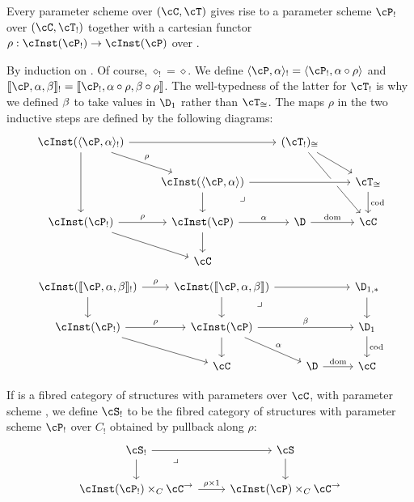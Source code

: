 \documentclass{amsart}
\let\S\cS
\let\P\cP
\def\emptyps{\diamond}
\def\typeps#1#2{\langle #1,#2\rangle}
\def\termps#1#2#3{\llbracket #1,#2,#3\rrbracket}
\let\C\cC
\let\T\cT
\def\pullback#1{\ar[#1,phantom,near start,"\lrcorner"]}
\begin{document}
\begin{prob}
  Every parameter scheme \P over $(\C,\T)$ gives rise to a parameter scheme $\P_!$ over $(\C,\T_!)$ together with a cartesian functor $\rho:\cInst(\P_!)\to\cInst(\P)$ over \C.
\end{prob}
\begin{constr}
  By induction on \P.
  Of course, $\emptyps_!=\emptyps$.
  We define $\typeps{\P}{\al}_! = \typeps{\P_!}{\al\circ \rho}$ and $\termps{\P}{\al}{\be}_! = \termps{\P_!}{\al\circ \rho}{\be\circ \rho}$.
  The well-typedness of the latter for $\T_!$ is why we defined $\beta$ to take values in $\D_1$ rather than $\T_{\cong}$.
  The maps $\rho$ in the two inductive steps are defined by the following diagrams:
    \[
    \begin{tikzcd}
      \cInst(\typeps{\P}{\al}_!) \ar[dr,"\rho"] \ar[rr] \ar[dd] && (\T_!)_{\cong} \ar[dr] \ar[ddr] \\
      & \cInst(\typeps{\P}{\al}) \ar[rr,crossing over] \ar[d] \pullback{dr} && \T_{\cong} \ar[d,"\mathrm{cod}"] \\
      \cInst(\P_!) \ar[r,"\rho"] \ar[dr] & \cInst(\P) \ar[r,"\al"] \ar[d] & \D \ar[r,"\mathrm{dom}"] & \C\\
      & \C
    \end{tikzcd}
    \]
    \[
    \begin{tikzcd}
      \cInst(\termps{\P}{\al}{\be}_!) \ar[r,"\rho"] \ar[d] & \cInst(\termps{\P}{\al}{\be}) \ar[rr] \ar[d] \pullback{dr} & & \D_{1,*} \ar[d] \\
      \cInst(\P_!) \ar[r,"\rho"] \ar[dr] & \cInst(\P) \ar[dr,"\al"] \ar[d] \ar[rr,"\be"] & \phantom{.} & \D_1 \ar[d,"\mathrm{cod}"]\\
      & \C & \D \ar[r,"\mathrm{dom}"] & \C
    \end{tikzcd}
    \]
\end{constr}

\begin{defn}
  If \S is a fibred category of structures with parameters over $\C$, with parameter scheme \P, we define $\S_!$ to be the fibred category of structures with parameter scheme $\P_!$ over $C_!$ obtained by pullback along $\rho:$
  \[
  \begin{tikzcd}
    \S_! \ar[r] \ar[d] \pullback{dr} & \S \ar[d] \\
    \cInst(\P_!)\times_C \C^\to \ar[r,"\rho\times 1"] & \cInst(\P)\times_C \C^\to
  \end{tikzcd}
  \]
\end{defn}
\end{document}
